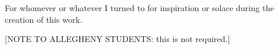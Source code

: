 %
%
%
\def\FileCreated{Sun Mar 23 08:36:23 1997}
\def\FileRevised{Mon Nov 24 09:50:13 1997}

\begin{dedication}
\vspace*{1in}
For whomever or whatever I turned to for inspiration or solace during the
creation of this work.

[NOTE TO ALLEGHENY STUDENTS:  this is not required.]
\end{dedication}
